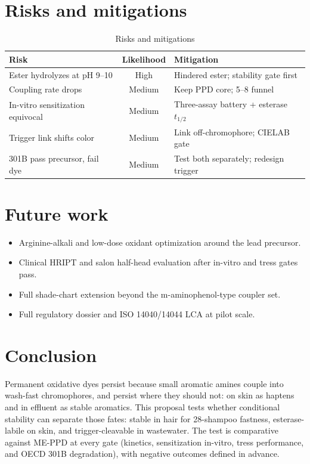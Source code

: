 \documentclass[11pt,a4paper]{article}
\begin{document}
\section{Risks and mitigations}

\begin{table}[h]
\centering
\caption{Risks and mitigations}
\label{tab:risks}
\begin{tabular}{@{}lcl@{}}
\toprule
Risk & Likelihood & Mitigation \\
\midrule
Ester hydrolyzes at pH 9--10 & High & Hindered ester; stability gate first \\
Coupling rate drops & Medium & Keep PPD core; 5--8 funnel \\
In-vitro sensitization equivocal & Medium & Three-assay battery + esterase $t_{1/2}$ \\
Trigger link shifts color & Medium & Link off-chromophore; CIELAB gate \\
301B pass precursor, fail dye & Medium & Test both separately; redesign trigger \\
\bottomrule
\end{tabular}
\end{table}

\section{Future work}

\begin{itemize}[leftmargin=1.5em]
\item Arginine-alkali and low-dose oxidant optimization around the lead precursor.
\item Clinical HRIPT and salon half-head evaluation after in-vitro and tress gates pass.
\item Full shade-chart extension beyond the m-aminophenol-type coupler set.
\item Full regulatory dossier and ISO 14040/14044 LCA at pilot scale.
\end{itemize}

\section{Conclusion}

Permanent oxidative dyes persist because small aromatic amines couple into wash-fast chromophores, and persist where they should not: on skin as haptens and in effluent as stable aromatics. This proposal tests whether conditional stability can separate those fates: stable in hair for 28-shampoo fastness, esterase-labile on skin, and trigger-cleavable in wastewater. The test is comparative against ME-PPD at every gate (kinetics, sensitization in-vitro, tress performance, and OECD 301B degradation), with negative outcomes defined in advance.
\end{document}
